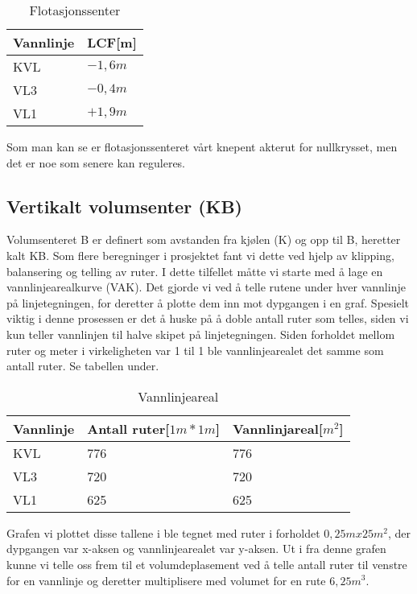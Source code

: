 \documentclass[norsk]{article}
\begin{document}
\begin{table}[htbp]
	\centering
    \caption{Flotasjonssenter}
    \label{tab:tableLCB}
    \hskip-3.0cm
    \begin{tabular}{l|l} 
      \hline
      \textbf{Vannlinje} &  \textbf{LCF[m]} \\ \hline
      KVL & $-1,6m$ \\ \hline
      VL3 & $-0,4m$ \\ \hline
      VL1 & $+1,9m$ \\ \hline
    \end{tabular}
\end{table}


Som man kan se er flotasjonssenteret vårt knepent akterut for nullkrysset, men det er noe som senere kan reguleres. 

  	\subsection{Vertikalt volumsenter (KB)}
Volumsenteret B er definert som avstanden fra kjølen (K) og opp til B, heretter kalt KB. Som flere beregninger i prosjektet fant vi dette ved hjelp av klipping, balansering og telling av ruter. I dette tilfellet måtte vi starte med å lage en vannlinjearealkurve (VAK). Det gjorde vi ved å telle rutene under hver vannlinje på linjetegningen, for deretter å plotte dem inn mot dypgangen i en graf. Spesielt viktig i denne prosessen er det å huske på å doble antall ruter som telles, siden vi kun teller vannlinjen til halve skipet på linjetegningen. Siden forholdet mellom ruter og meter i virkeligheten var 1 til 1 ble vannlinjearealet det samme som antall ruter. Se tabellen under.

\begin{table}[htbp]
	\centering
    \caption{Vannlinjeareal}
    \label{tab:tableVAK}
    \hskip-3.0cm
    \begin{tabular}{l|l|l} 
      \hline
      \textbf{Vannlinje} &  \textbf{Antall ruter[$1m*1m$]} & \textbf{Vannlinjareal[$m^2$]} \\ \hline
      KVL & 776 & 776 \\ \hline
      VL3 & 720 & 720 \\ \hline
      VL1 & 625 & 625 \\ \hline
    \end{tabular}
\end{table}

Grafen vi plottet disse tallene i ble tegnet med ruter i forholdet $0,25mx25m^2$, der dypgangen var x-aksen og vannlinjearealet var y-aksen. Ut i fra denne grafen kunne vi telle oss frem til et volumdeplasement ved å telle antall ruter til venstre for en vannlinje og deretter multiplisere med volumet for en rute $6,25m^3$. \\
\end{document}
